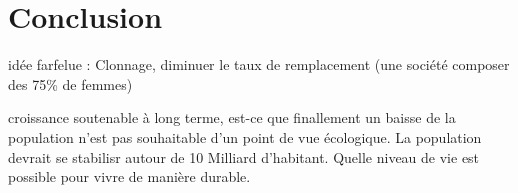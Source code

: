 \chapter*{Conclusion}
idée farfelue : 
Clonnage, diminuer le taux de remplacement (une société composer des 75\% de femmes) 

croissance soutenable à long terme, est-ce que finallement un baisse de la population n'est pas souhaitable d'un point de vue écologique. La population devrait se stabilisr autour de 10 Milliard d'habitant. Quelle niveau de vie est possible pour vivre de manière durable. 

